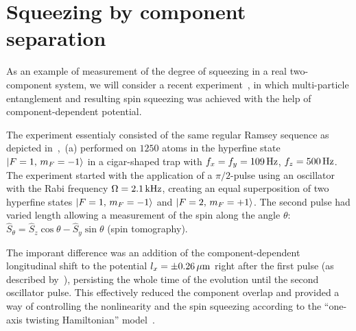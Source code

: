 \section{Squeezing by component separation}

As an example of measurement of the degree of squeezing in a real two-component  system, we will consider a recent experiment~\cite{Riedel2010}, in which multi-particle entanglement and resulting spin squeezing was achieved with the help of component-dependent potential.

The experiment essentialy consisted of the same regular Ramsey sequence as depicted in~,~(a) performed on $1250$ \Rb{} atoms in the hyperfine state ${\mbox{\ensuremath{\left\vert F=1,\, m_F=-1 \right\rangle}}}$ in a cigar-shaped trap with $f_x = f_y = 109\mbox{\ensuremath{\,\mathrm{Hz}}}$, $f_z = 500\mbox{\ensuremath{\,\mathrm{Hz}}}$.
The experiment started with the application of a $\pi/2$-pulse using an oscillator with the Rabi frequency $\Omega=2.1\mbox{\ensuremath{\,\mathrm{kHz}}}$, creating an equal superposition of two hyperfine states ${\mbox{\ensuremath{\left\vert F=1,\, m_F=-1 \right\rangle}}}$ and ${\mbox{\ensuremath{\left\vert F=2,\, m_F=+1 \right\rangle}}}$.
The second pulse had varied length allowing a measurement of the spin along the angle $\theta$: $\hat{S}_\theta = \hat{S}_z \cos \theta - \hat{S}_y \sin \theta$ (spin tomography).

The imporant difference was an addition of the component-dependent longitudinal shift to the potential $l_x = \pm 0.26\mbox{\ensuremath{\,\mathrm{\mu m}}}$ right after the first pulse (as described by~), persisting the whole time of the evolution until the second oscillator pulse.
This effectively reduced the component overlap and provided a way of controlling the nonlinearity and the spin squeezing according to the ``one-axis twisting Hamiltonian'' model~\cite{Kitagawa1993}.

